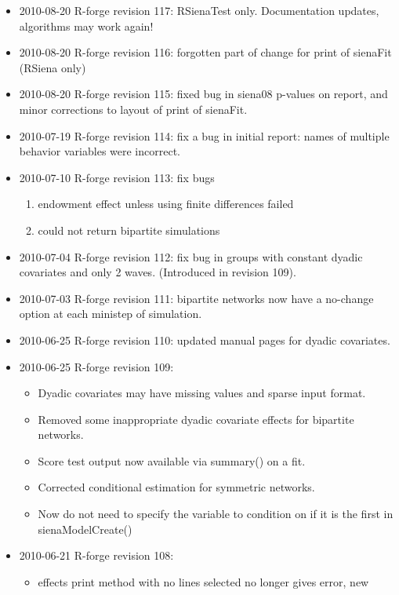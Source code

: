 \documentclass[a4paper,fleqn,11pt]{article}
\newcommand{\+}{\, + \,}
\newcommand{\sfn}[1]{\textsf{#1}}
\begin{document}
{\begin{small}
\begin{itemize}
\begin{itemize}
\item Bug in calculation of starting values for behavior variables.
(RSienaTest only)
\end{itemize}
\item 2010-08-20 R-forge revision 117: RSienaTest only. Documentation updates,
algorithms may work again!
\item 2010-08-20 R-forge revision 116: forgotten
part of change for print of sienaFit (RSiena only)
\item 2010-08-20 R-forge revision 115: fixed bug in siena08 p-values on report,
and minor corrections to layout of print of sienaFit.
\item 2010-07-19 R-forge revision 114: fix a bug in initial report: names of
  multiple behavior variables were incorrect.
\item 2010-07-10 R-forge revision 113: fix bugs
\begin{enumerate}
\item endowment effect unless using finite differences failed
\item could not return bipartite simulations
\end{enumerate}
\item 2010-07-04 R-forge revision 112: fix bug in groups with constant dyadic
  covariates and only 2 waves. (Introduced in revision 109).
\item 2010-07-03 R-forge revision 111: bipartite networks now have a no-change
  option at each ministep of simulation.
\item 2010-06-25 R-forge revision 110: updated manual pages for dyadic
  covariates.
\item 2010-06-25 R-forge revision 109:
\begin{itemize}
\item Dyadic covariates may have missing values and sparse input format.
\item Removed some inappropriate dyadic covariate effects for bipartite
  networks.
\item Score test output now available via summary() on a fit.
\item Corrected conditional estimation for symmetric networks.
\item Now do not need to specify the variable to condition on if it is the first
  in \sfn{sienaModelCreate()}
\end{itemize}
\item 2010-06-21 R-forge revision 108:
\begin{itemize}
\item effects print method with no lines selected no longer gives error, new

\end{itemize}
\end{itemize}
\end{small}}
\end{document}
